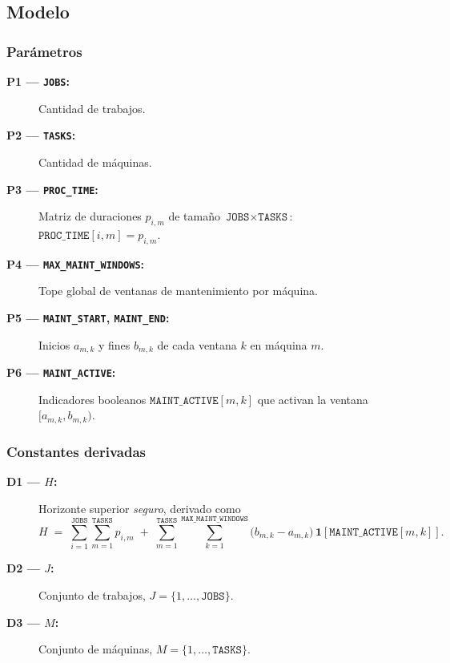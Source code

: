 
\subsection{Modelo}\label{sec:01-jobshop_mantenimiento-modelo}

\subsubsection*{Parámetros}
\begin{description}
  \item[\textbf{P1 — \texttt{JOBS}:}] Cantidad de trabajos.
  \item[\textbf{P2 — \texttt{TASKS}:}] Cantidad de máquinas.
  \item[\textbf{P3 — \texttt{PROC\_TIME}:}] Matriz de duraciones \(p_{i,m}\) de tamaño \(\texttt{JOBS}\times\texttt{TASKS}\): \(\texttt{PROC\_TIME}[i,m]=p_{i,m}\).
  \item[\textbf{P4 — \texttt{MAX\_MAINT\_WINDOWS}:}] Tope global de ventanas de mantenimiento por máquina.
  \item[\textbf{P5 — \texttt{MAINT\_START}, \texttt{MAINT\_END}:}] Inicios \(a_{m,k}\) y fines \(b_{m,k}\) de cada ventana \(k\) en máquina \(m\).
  \item[\textbf{P6 — \texttt{MAINT\_ACTIVE}:}] Indicadores booleanos \(\texttt{MAINT\_ACTIVE}[m,k]\) que activan la ventana \([a_{m,k}, b_{m,k})\).
\end{description}

\subsubsection*{Constantes derivadas}
\begin{description}
  \item[\textbf{D1 — \(H\):}] Horizonte superior \emph{seguro}, derivado como
        \[
          H \;=\; \sum_{i=1}^{\texttt{JOBS}}\sum_{m=1}^{\texttt{TASKS}} p_{i,m}
          \;+\; \sum_{m=1}^{\texttt{TASKS}}\sum_{k=1}^{\texttt{MAX\_MAINT\_WINDOWS}}
          \bigl(b_{m,k}-a_{m,k}\bigr)\,\mathbf{1}\!\left[\texttt{MAINT\_ACTIVE}[m,k]\right].
        \]
  \item[\textbf{D2 — \(J\):}] Conjunto de trabajos, \(J=\{1,\dots,\texttt{JOBS}\}\).
  \item[\textbf{D3 — \(M\):}] Conjunto de máquinas, \(M=\{1,\dots,\texttt{TASKS}\}\).
\end{description}

